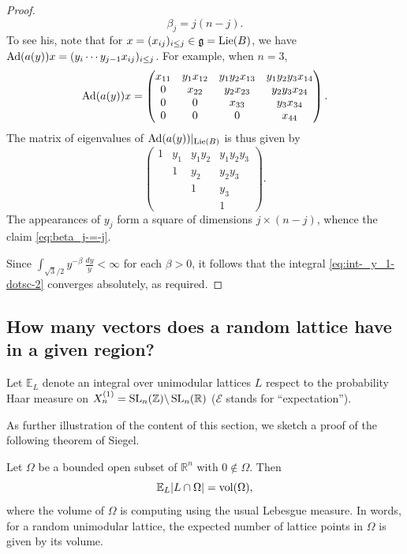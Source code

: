 \documentclass[reqno]{amsart} 
\begin{document}
\begin{proof}
\begin{equation}
    \beta_j = j ( n - j).
  \end{equation}
  To see his, note that for $x = (x_{i j})_{i \leq j} \in \mathfrak{g} = \operatorname{Lie}(B)$, we have $\operatorname{Ad}(a(y)) x = (y_i \dotsb y_{j-1} x_{i j})_{i \leq j}$.  For example, when $n = 3$,
  \begin{equation*}
    \operatorname{Ad}(a(y)) x =
    \begin{pmatrix}
      x _{1 1} & y_1 x_{1 2} & y _1 y _2 x _{1 3} &  y _1 y _2 y _3 x _{1 4} \\
      0 & x _{2 2} & y _2 x _{2 3 } & y _2 y _3 x _{2 4} \\
      0 & 0 & x _{3 3} & y _3 x _{3 4} \\
      0 & 0 & 0 & x _{4 4}
    \end{pmatrix}
    .
  \end{equation*}
  The matrix of eigenvalues of $\operatorname{Ad}(a(y))|_{\operatorname{Lie}(B)}$ is thus given by
  \begin{equation*}
    \begin{pmatrix}
      1 & y_1 & y _1 y _2  &  y _1 y _2 y _3  \\
        & 1 & y _2  & y _2 y _3  \\
        &  & 1  & y _3  \\
        & & & 1
    \end{pmatrix}
    .
  \end{equation*}
  The appearances of $y_j$ form a square of dimensions $j \times (n-j)$, whence the claim \eqref{eq:beta_j-=-j}.

  Since $\int_{\sqrt{3}/2} y^{-\beta} \, \frac{d y}{y} < \infty$ for each $\beta > 0$, it follows that the integral \eqref{eq:int-_y_1-dotsc-2} converges absolutely, as required.
\end{proof}


\subsection{How many vectors does a random lattice have in a given region?}
\label{sec:orge0ceafc}

Let $\mathbb{E}_{L}$ denote an integral over unimodular lattices $L$ respect to the probability Haar measure on $X_n^{(1)} = \operatorname{SL}_n(\mathbb{Z}) \backslash \operatorname{SL}_n(\mathbb{R})$ ($\mathcal{E}$ stands for ``expectation'').

As further illustration of the content of this section, we sketch a proof of the following theorem of Siegel.
\begin{theorem}
  Let $\Omega$ be a bounded open subset of $\mathbb{R}^n$ with $0 \notin \Omega$.  Then
  \begin{equation*}
    \mathbb{E}_L | L \cap \Omega| = \operatorname{vol}(\Omega),
  \end{equation*}
  where the volume of $\Omega$ is computing using the usual Lebesgue measure.  In words, for a random unimodular lattice, the expected number of lattice points in $\Omega$ is given by its volume.
\end{theorem}
\end{document}
